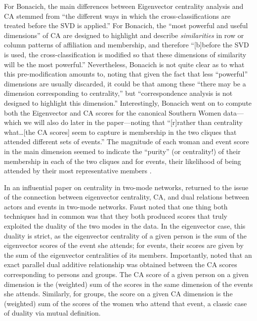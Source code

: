 \documentclass[a4paper,fleqn]{cas-sc}
\begin{document}
For Bonacich, the main differences between Eigenvector centrality analysis and CA stemmed from ``the different ways in which the cross-classifications are treated before the SVD is applied.'' For Bonacich, the ``most powerful and useful dimensions'' of CA are designed to highlight and describe \textit{similarities} in row or column patterns of affiliation and membership, and therefore ``[b]before the SVD is used, the cross-classification is modified so that these dimensions of similarity will be the most powerful.'' Nevertheless, Bonacich is not quite clear as to what this pre-modification amounts to, noting that given the fact that less ``powerful'' dimensions are usually discarded, it could be that among these ``there may be a dimension corresponding to centrality,'' but ``correspondence analysis is not designed to highlight this dimension.'' Interestingly, Bonacich went on to compute both the Eigenvector and CA scores for the canonical Southern Women data---which we will also do later in the paper---noting that ``[r]rather than centrality what\ldots[the CA scores] seem to capture is membership in the two cliques that attended different sets of events.'' The magnitude of each woman and event score in the main dimension seemed to indicate the ``purity'' (or centrality!) of their membership in each of the two cliques and for events, their likelihood of being attended by their most representative members  \citep[164]{bonacich1991simultaneous}. 

In an influential paper on centrality in two-mode networks, \citet{faust1997centrality} returned to the issue of the connection between eigenvector centrality, CA, and dual relations between actors and events in two-mode networks. Faust noted that one thing both techniques had in common was that they both produced scores that truly exploited the duality of the two modes in the data. In the eigenvector case, this duality is strict, as the eigenvector centrality of a given person is the sum of the eigenvector scores of the event she attends; for events, their scores are given by the sum of the eigenvector centralities of its members. Importantly, \citet{faust1997centrality} noted that an exact parallel dual additive relationship was obtained between the CA scores corresponding to persons and groups. The CA score of a given person on a given dimension is the (weighted) sum of the scores in the same dimension of the events she attends. Similarly, for groups, the score on a given CA dimension is the (weighted) sum of the scores of the women who attend that event, a classic case of duality via mutual definition. %
\end{document}
